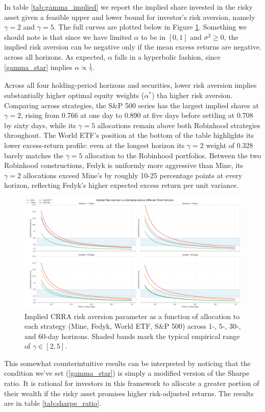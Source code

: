 In table \ref{tab:gamma_implied} we report the implied share invested in the risky asset given a feasible upper and lower bound for investor's risk aversion, namely $\gamma=2$ and $\gamma=5$.
The full curves are plotted below in Figure \ref{fig:alpha_gamma}.
Something we should note is that since we have limited $\alpha$ to be in $[0,1]$ and $\sigma^2 \geq 0$, the implied risk aversion can be negative only if the mean excess returns are negative.
across all horizons.
As expected, $\alpha$ falls in a hyperbolic fashion, since \ref{gamma_star} implies $\alpha \propto \frac{1}{\gamma}$.

Across all four holding-period horizons and securities, lower risk aversion implies substantially higher optimal equity weights ($\alpha^*$) tha higher risk aversion.
Comparing across strategies, the S\&P 500 series has the largest implied shares at $\gamma=2$, rising from 0.766 at one day to 0.890 at five days before settling at 0.708 by sixty days, while its $\gamma=5$ allocations remain above both Robinhood strategies throughout. 
The World ETF's position at the bottom of the table highlights its lower excess-return profile: even at the longest horizon its $\gamma=2$ weight of 0.328 barely matches the $\gamma=5$ allocation to the Robinhood portfolios. 
Between the two Robinhood constructions, Fedyk is uniformly more aggressive than Mine, its $\gamma=2$ allocations exceed Mine's by roughly 10-25 percentage points at every horizon, reflecting Fedyk's higher expected excess return per unit variance.

\begin{figure}[H]
    \centering
    \includegraphics[width=\linewidth]{../images/alpha_gamma.png}
\caption{Implied CRRA risk aversion parameter as a function of allocation to each strategy (Mine, Fedyk, World ETF, S\&P 500) across 1-, 5-, 30-, and 60-day horizons. Shaded bands mark the typical empirical range of $\gamma \in [2,5]$.}
\label{fig:alpha_gamma}
\end{figure}    

This somewhat counterintuitive results can be interpreted by noticing that the condition we've set (\ref{gamma_star}) is simply a modified version of the Sharpe ratio.
It is rational for investors in this framework to allocate a greater portion of their wealth if the risky asset promises higher risk-adjusted returns.
The results are in table \ref{tab:sharpe_ratio}.